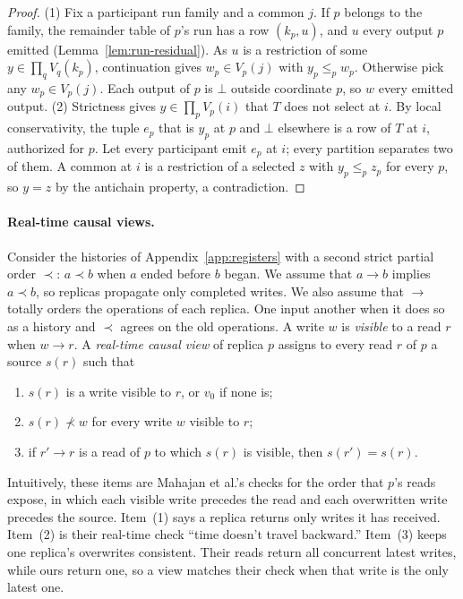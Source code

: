 \begin{proof}
(1) Fix a participant run family and a common \indesc $j$.  If $p$ belongs to
the family, the remainder table of $p$'s run has a row $(k_p,u)$, and $u$ \outrel every output $p$ emitted
(Lemma~\ref{lem:run-residual}).  As $u$ is a restriction of some
$y\in\prod_qV_q(k_p)$, continuation gives $w_p\in V_p(j)$ with $y_p\le_p w_p$.
Otherwise pick any $w_p\in V_p(j)$.  Each output of $p$ is $\bot$ outside
coordinate $p$, so $w$ \outrel every emitted output.
(2) Strictness gives $y\in\prod_pV_p(i)$ that $T$ does not select at $i$.  By
local conservativity, the tuple $e_p$ that is $y_p$ at $p$ and $\bot$
elsewhere is a row of $T$ at $i$, authorized for $p$.  Let every participant
emit $e_p$ at $i$; every partition separates two of them.  A common \outnoun
at $i$ is a restriction of a selected $z$ with $y_p\le_p z_p$ for every $p$, so
$y=z$ by the antichain property, a contradiction.
\end{proof}

\paragraph{Real-time causal views.}
Consider the histories of Appendix~\ref{app:registers} with a second strict
partial order $\prec$: $a\prec b$ when $a$ ended before $b$ began.  We assume
that $a\to b$ implies $a\prec b$, so replicas propagate only completed writes.
We also assume that $\to$ totally orders the operations of each replica.  One
input \inrel another when it does so as a history and $\prec$ agrees on the
old operations.  A write $w$ is \emph{visible} to a read $r$ when $w\to r$.  A
\emph{real-time causal view} of replica $p$ assigns to every read $r$ of $p$ a
source $s(r)$ such that
\begin{enumerate}
  \item $s(r)$ is a write visible to $r$, or $v_0$ if none is;
  \item $s(r)\not\prec w$ for every write $w$ visible to $r$;
  \item if $r'\to r$ is a read of $p$ to which $s(r)$ is visible, then
        $s(r')=s(r)$.
\end{enumerate}
Intuitively, these items are Mahajan et al.'s checks for the order that $p$'s
reads expose, in which each visible write precedes the read and each
overwritten write precedes the source.  Item~(1) says a replica returns only
writes it has received.  Item~(2) is their real-time check ``time doesn't
travel backward.''  Item~(3) keeps one replica's overwrites consistent.  Their
reads return all concurrent latest writes, while ours return one, so a view
matches their check when that write is the only latest one.

